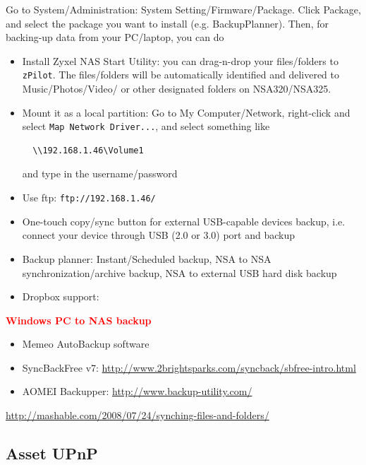 Go to System/Administration: System Setting/Firmware/Package. Click Package, and
select the package you want to install (e.g. BackupPlanner). Then, for
backing-up data from your PC/laptop, you can do
\begin{itemize}
  \item Install Zyxel NAS Start Utility: you can drag-n-drop your
  files/folders to \verb!zPilot!. The files/folders will be automatically
  identified and delivered to Music/Photos/Video/ or other designated folders on
  NSA320/NSA325.
  
  \item Mount it as a local partition: Go to My Computer/Network, right-click
  and select \verb!Map Network Driver...!, and select something like 
  \begin{verbatim}
  \\192.168.1.46\Volume1
  \end{verbatim}
  and type in the username/password
  
  \item Use ftp: \verb!ftp://192.168.1.46/!

  \item One-touch copy/sync button for external USB-capable devices backup, i.e.
connect your device through USB (2.0 or 3.0) port and backup

  \item Backup planner: Instant/Scheduled backup, NSA to NSA
synchronization/archive backup, NSA to external USB hard disk backup

  \item Dropbox support:
\end{itemize}

\textcolor{red}{\bf Windows PC to NAS backup}
\begin{itemize}
  \item  Memeo AutoBackup software
  
  \item SyncBackFree v7: 
  \url{http://www.2brightsparks.com/syncback/sbfree-intro.html}

  \item AOMEI Backupper: \url{http://www.backup-utility.com/}
\end{itemize}
\url{http://mashable.com/2008/07/24/synching-files-and-folders/}


\subsection{Asset UPnP}

